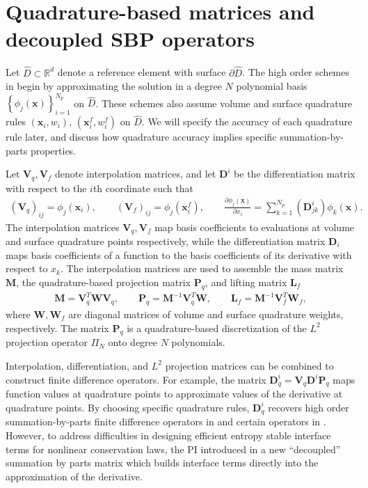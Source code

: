 \documentclass[review]{siamart0216}
\theoremstyle{assumption}
\renewcommand{\hat}[1]{\hat{#1}}
\newcommand{\pd}[2]{\frac{\partial#1}{\partial#2}}
\newcommand{\LRp}[1]{\left( #1 \right)}
\newcommand{\LRc}[1]{\left\{ #1 \right\}}
\renewcommand{\hat}{\widehat}
\newcommand{\note}[1]{{\color{blue}{#1}}}
\begin{document}
\section{Quadrature-based matrices and decoupled SBP operators}

\note{TODO: Standardize hat notation for operators/normals: can refer to operators on reference element and do $k$ superscript for physical elements, or do hats on reference element.}
Let $\hat{D} \subset\mathbb{R}^d$ denote a reference element with surface $\partial \hat{D}$.  
The high order schemes in \cite{chan2017discretely, chan2018discretely} begin by approximating the solution in a degree $N$ polynomial basis $\LRc{\phi_j({\bm{x}})}_{i=1}^{N_p}$ on $\hat{D}$.  These schemes also assume volume and surface quadrature rules $({\bm{x}}_i, w_i)$, $\LRp{{\bm{x}}^f_i,w^f_i}$ on $\hat{D}$.  We will specify the accuracy of each quadrature rule later, and discuss how quadrature accuracy implies specific summation-by-parts properties.  

Let $\bm{V}_q,\bm{V}_f$ denote interpolation matrices, and let $\bm{D}^i$ be the differentiation matrix with respect to the $i$th coordinate such that
\begin{gather}
\LRp{\bm{V}_q}_{ij} = \phi_j(\bm{x}_i), \qquad \LRp{\bm{V}_f}_{ij} = \phi_j(\bm{x}^f_i), \qquad \pd{\phi_j(\bm{x})}{x_i} = \sum_{k=1}^{N_p} \LRp{\bm{D}^i_{jk}} \phi_k(\bm{x}).
\end{gather}
The interpolation matrices $\bm{V}_q,\bm{V}_f$ map basis coefficients to evaluations at volume and surface quadrature points respectively, while the differentiation matrix ${\bm{D}}_i$ maps basis coefficients of a function to the basis coefficients of its derivative with respect to $x_k$.  The interpolation matrices are used to assemble the mass matrix $\bm{M}$, the quadrature-based projection matrix $\bm{P}_q$, and lifting matrix $\bm{L}_f$
\begin{gather}
\bm{M} = \bm{V}_q^T\bm{W}\bm{V}_q, \qquad \bm{P}_q = \bm{M}^{-1}\bm{V}_q^T\bm{W}, \qquad \bm{L}_f = \bm{M}^{-1}\bm{V}_f^T\bm{W}_f,
\end{gather}
where $\bm{W}, \bm{W}_f$ are diagonal matrices of volume and surface quadrature weights, respectively.  The matrix $\bm{P}_q$ is a quadrature-based discretization of the $L^2$ projection operator $\Pi_N$ onto degree $N$ polynomials.

Interpolation, differentiation, and $L^2$ projection matrices can be combined to construct finite difference operators.  For example, the matrix $\bm{D}^i_q = \bm{V}_q\bm{D}^i\bm{P}_q$ maps function values at quadrature points to approximate values of the derivative at quadrature points.  By choosing specific quadrature rules, $\bm{D}^i_q$ recovers high order summation-by-parts finite difference operators in \cite{gassner2013skew, fernandez2014generalized, ranocha2018generalised} and certain operators in \cite{hicken2016multidimensional}.  However, to address difficulties in designing efficient entropy stable interface terms for nonlinear conservation laws, the PI introduced in \cite{chan2017discretely} a new ``decoupled'' summation by parts matrix which builds interface terms directly into the approximation of the derivative.  
\end{document}
